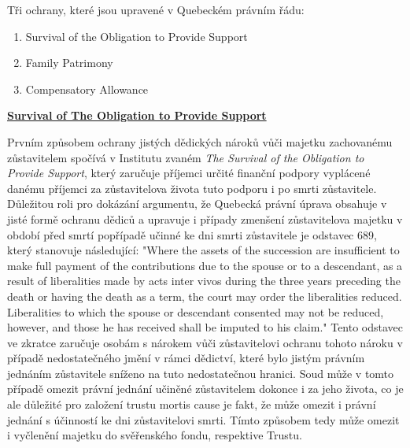 \documentclass{article}
\begin{document}
\vspace{5 mm}

Tři ochrany, které jsou upravené v Quebeckém právním řádu:

\begin{enumerate}
\item Survival of the Obligation to Provide Support
\item Family Patrimony
\item Compensatory Allowance	
\end{enumerate}

\vspace{5 mm}

\underline{\textbf{Survival of The Obligation to Provide Support}}

Prvním způsobem ochrany jistých dědických nároků vůči majetku zachované\-mu zůstavitelem spočívá v Institutu zvaném \textit{The Survival of the Obligation to Provide Support}, který zaručuje příjemci určité finanční podpory vyplácené danému příjemci za zůstavitelova života tuto podporu i po smrti zůstavitele. \\

Důležitou roli pro dokázání argumentu, že Quebecká právní úprava obsahuje v jisté formě ochranu dědiců a upravuje i případy zmenšení zůstavitelova majetku v období před smrtí popřípadě učinné ke dni smrti zůstavitele je odstavec 689, který stanovuje následující: "Where the assets of the succession are insufficient to make full payment of the contributions due to the spouse or to a descendant, as a result of liberalities made by acts inter vivos during the three years preceding the death or having the death as a term, the court may order the liberalities reduced. \\

Liberalities to which the spouse or descendant consented may not be reduced, however, and those he has received shall be imputed to his claim." Tento odstavec ve zkratce zaručuje osobám s nárokem vůči zůstavitelovi ochranu tohoto nároku v případě nedostatečného jmění v rámci dědictví, které bylo jistým právním jednáním zůstavitele sníženo na tuto nedostatečnou hranici. Soud může v tomto případě omezit právní jednání učiněné zůstavitelem dokonce i za jeho života, co je ale důležité pro založení trustu mortis cause je fakt, že může omezit i právní jednání s účinností ke dni zůstavitelovi smrti. Tímto způsobem tedy může omezit i vyčlenění majetku do svěřenského fondu, respektive Trustu. \\
\end{document}
